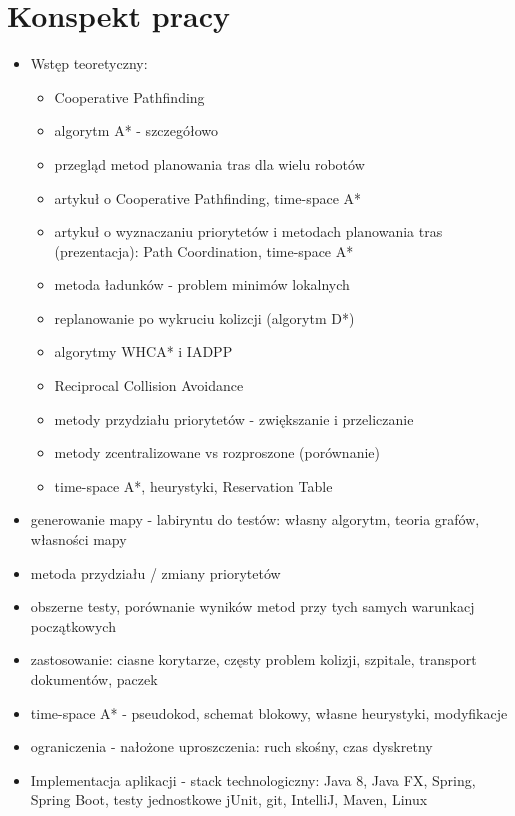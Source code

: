 \chapter{Konspekt pracy}
\label{ch:konspekt}
\begin{itemize}
	\item Wstęp teoretyczny:
	\begin{itemize}
		\item Cooperative Pathfinding
		\item algorytm A* - szczegółowo
		\item przegląd metod planowania tras dla wielu robotów
		\item artykuł o Cooperative Pathfinding, time-space A*
		\item artykuł o wyznaczaniu priorytetów i metodach planowania tras (prezentacja): Path Coordination, time-space A*
		\item metoda ładunków - problem minimów lokalnych
		\item replanowanie po wykruciu kolizcji (algorytm D*)
		\item algorytmy WHCA* i IADPP
		\item Reciprocal Collision Avoidance
		\item metody przydziału priorytetów - zwiększanie i przeliczanie
		\item metody zcentralizowane vs rozproszone (porównanie)
		\item time-space A*, heurystyki, Reservation Table
	\end{itemize}
	\item generowanie mapy - labiryntu do testów: własny algorytm, teoria grafów, własności mapy
	\item metoda przydziału / zmiany priorytetów
	\item obszerne testy, porównanie wyników metod przy tych samych warunkacj początkowych
	\item zastosowanie: ciasne korytarze, częsty problem kolizji, szpitale, transport dokumentów, paczek
	\item time-space A* - pseudokod, schemat blokowy, własne heurystyki, modyfikacje
	\item ograniczenia - nałożone uproszczenia: ruch skośny, czas dyskretny
	\item Implementacja aplikacji - stack technologiczny: Java 8, Java FX, Spring, Spring Boot, testy jednostkowe jUnit, git, IntelliJ, Maven, Linux
\end{itemize}